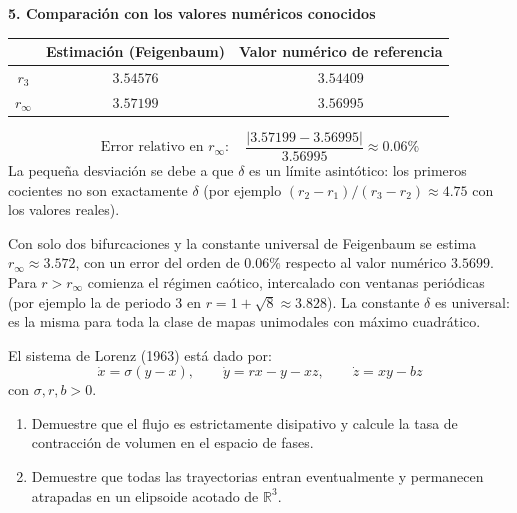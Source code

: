 \documentclass[11pt,a4paper]{article}
\newenvironment{solucion}[1][Solución Detallada]{%
    \vspace{1.5mm}%
    \noindent{\large\textbf{Solución:}}\par\vspace{1.5mm}%
}{%
    \par\vspace{3mm}%
}
\newenvironment{conclusion}[1][Interpretación Dinámica y Conclusión]{%
    \vspace{2mm}%
    \noindent{\large\textbf{Conclusión:}}\par\vspace{1.5mm}%
}{%
    \par\vspace{3mm}%
}
\begin{document}
\begin{solucion}
\textbf{\large 5. Comparación con los valores numéricos conocidos}
\begin{center}
\renewcommand{\arraystretch}{1.25}
\begin{tabular}{c c c}
\hline
 & \textbf{Estimación (Feigenbaum)} & \textbf{Valor numérico de referencia} \\ \hline
$r_3$ & $3.54576$ & $3.54409$ \\
$r_\infty$ & $3.57199$ & $3.56995$ \\ \hline
\end{tabular}
\end{center}
\[
\text{Error relativo en } r_\infty: \quad \frac{|3.57199 - 3.56995|}{3.56995} \approx 0.06\%
\]
La pequeña desviación se debe a que $\delta$ es un límite asintótico: los primeros cocientes no son exactamente $\delta$ (por ejemplo $(r_2 - r_1)/(r_3 - r_2) \approx 4.75$ con los valores reales).

\end{solucion}

\begin{conclusion}
Con solo dos bifurcaciones y la constante universal de Feigenbaum se estima $r_\infty \approx 3.572$, con un error del orden de $0.06\%$ respecto al valor numérico $3.5699$. Para $r > r_\infty$ comienza el régimen caótico, intercalado con ventanas periódicas (por ejemplo la de periodo 3 en $r = 1 + \sqrt{8} \approx 3.828$). La constante $\delta$ es universal: es la misma para toda la clase de mapas unimodales con máximo cuadrático.
\end{conclusion}

\vspace{3mm}

\begin{problema}[Problema 4.4]
El sistema de Lorenz (1963) está dado por:
\[
\dot{x} = \sigma(y - x), \qquad \dot{y} = r x - y - x z, \qquad \dot{z} = x y - b z
\]
con $\sigma, r, b > 0$.
\begin{enumerate}[label=\textbf{\alph*)}]
    \item Demuestre que el flujo es estrictamente disipativo y calcule la tasa de contracción de volumen en el espacio de fases.
    \item Demuestre que todas las trayectorias entran eventualmente y permanecen atrapadas en un elipsoide acotado de $\mathbb{R}^3$.
\end{enumerate}
\end{problema}
\end{document}

